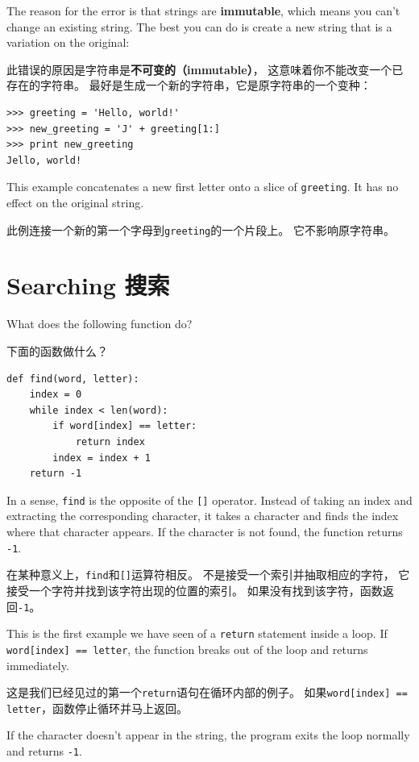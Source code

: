 \documentclass[10pt]{book}
\begin{document}
\begin{CJK}{UTF8}{gbsn}
The reason for the error is that
strings are {\bf immutable}, which means you can't change an
existing string.  The best you can do is create a new string
that is a variation on the original:

此错误的原因是字符串是{\bf 不可变的（immutable）}，
这意味着你不能改变一个已存在的字符串。
最好是生成一个新的字符串，它是原字符串的一个变种：

\begin{verbatim}
>>> greeting = 'Hello, world!'
>>> new_greeting = 'J' + greeting[1:]
>>> print new_greeting
Jello, world!
\end{verbatim}
%
This example concatenates a new first letter onto
a slice of {\tt greeting}.  It has no effect on
the original string.

此例连接一个新的第一个字母到{\tt greeting}的一个片段上。
它不影响原字符串。

\section{Searching 搜索}
\label{find}

What does the following function do?

下面的函数做什么？

\begin{verbatim}
def find(word, letter):
    index = 0
    while index < len(word):
        if word[index] == letter:
            return index
        index = index + 1
    return -1
\end{verbatim}
%
In a sense, {\tt find} is the opposite of the {\tt []} operator.
Instead of taking an index and extracting the corresponding character,
it takes a character and finds the index where that character
appears.  If the character is not found, the function returns {\tt
-1}.

在某种意义上，{\tt find}和{\tt []}运算符相反。
不是接受一个索引并抽取相应的字符，
它接受一个字符并找到该字符出现的位置的索引。
如果没有找到该字符，函数返回{\tt -1}。

This is the first example we have seen of a {\tt return} statement
inside a loop.  If {\tt word[index] == letter}, the function breaks
out of the loop and returns immediately.

这是我们已经见过的第一个{\tt return}语句在循环内部的例子。
如果{\tt word[index] == letter}，函数停止循环并马上返回。

If the character doesn't appear in the string, the program
exits the loop normally and  returns {\tt -1}.


\end{CJK}
\end{document}
